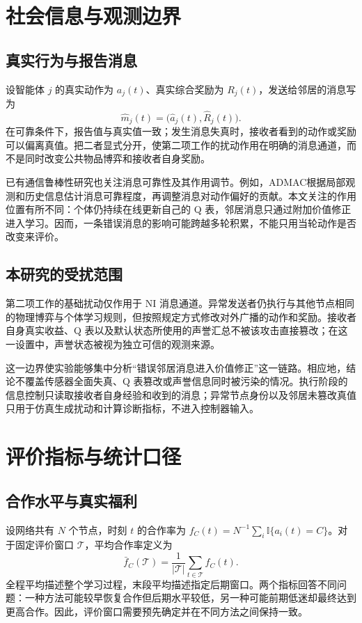 \section{社会信息与观测边界}
\subsection{真实行为与报告消息}

设智能体 $j$ 的真实动作为 $a_j(t)$、真实综合奖励为 $R_j(t)$，发送给邻居的消息写为
\begin{equation}
 \widehat m_j(t)=\bigl(\widehat a_j(t),\widehat R_j(t)\bigr).
 \label{eq:foundation-message}
\end{equation}
在可靠条件下，报告值与真实值一致；发生消息失真时，接收者看到的动作或奖励可以偏离真值。把二者显式分开，使第二项工作的扰动作用在明确的消息通道，而不是同时改变公共物品博弈和接收者自身奖励。

已有通信鲁棒性研究也关注消息可靠性及其作用调节。例如，ADMAC根据局部观测和历史信息估计消息可靠程度，再调整消息对动作偏好的贡献\cite{yu2024admac}。本文关注的作用位置有所不同：个体仍持续在线更新自己的 Q 表，邻居消息只通过附加价值修正进入学习。因而，一条错误消息的影响可能跨越多轮积累，不能只用当轮动作是否改变来评价。

\subsection{本研究的受扰范围}

第二项工作的基础扰动仅作用于 NI 消息通道。异常发送者仍执行与其他节点相同的物理博弈与个体学习规则，但按照规定方式修改对外广播的动作和奖励。接收者自身真实收益、Q 表以及默认状态所使用的声誉汇总不被该攻击直接篡改；在这一设置中，声誉状态被视为独立可信的观测来源。

这一边界使实验能够集中分析“错误邻居消息进入价值修正”这一链路。相应地，结论不覆盖传感器全面失真、Q 表篡改或声誉信息同时被污染的情况。执行阶段的信息控制只读取接收者自身经验和收到的消息；异常节点身份以及邻居未篡改真值只用于仿真生成扰动和计算诊断指标，不进入控制器输入。

\section{评价指标与统计口径}
\subsection{合作水平与真实福利}

设网络共有 $N$ 个节点，时刻 $t$ 的合作率为 $f_C(t)=N^{-1}\sum_i\mathbb I\{a_i(t)=C\}$。对于固定评价窗口 $\mathcal T$，平均合作率定义为
\begin{equation}
 \bar f_C(\mathcal T)=\frac{1}{|\mathcal T|}\sum_{t\in\mathcal T}f_C(t).
 \label{eq:foundation-mean-coop}
\end{equation}
全程平均描述整个学习过程，末段平均描述指定后期窗口。两个指标回答不同问题：一种方法可能较早恢复合作但后期水平较低，另一种可能前期低迷却最终达到更高合作。因此，评价窗口需要预先确定并在不同方法之间保持一致。

